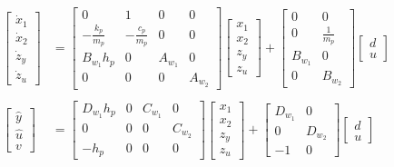 \documentclass{scrreprt}
\begin{document}
\begin{equation}
\begin{aligned}
\begin{bmatrix}
\dot{x}_1 \\
\dot{x}_2 \\
\dot{z}_y \\
\dot{z}_u
\end{bmatrix}
&=
\begin{bmatrix}
0 & 1 & 0 & 0 \\
-\frac{k_p}{m_p} & -\frac{c_p}{m_p} & 0 & 0 \\
B_{w_1}h_p & 0 & A_{w_1} & 0 \\
0 & 0 & 0 & A_{w_2}
\end{bmatrix}
\begin{bmatrix}
x_1 \\
x_2 \\
z_y \\
z_u
\end{bmatrix}
+
\begin{bmatrix}
0 & 0 \\
0 & \frac{1}{m_p} \\
B_{w_1} & 0 \\
0 & B_{w_2}
\end{bmatrix}
\begin{bmatrix}
d \\
u
\end{bmatrix}
\\ \\
\begin{bmatrix}
\hat{y} \\
\hat{u} \\
v
\end{bmatrix}
&=
\begin{bmatrix}
D_{w_1}h_p & 0 & C_{w_1} & 0 \\
0 & 0 & 0 & C_{w_2} \\
-h_p & 0 & 0 & 0
\end{bmatrix}
\begin{bmatrix}
x_1 \\
x_2 \\
z_y \\
z_u
\end{bmatrix}
+
\begin{bmatrix}
D_{w_1} & 0 \\
0 & D_{w_2} \\
-1 & 0
\end{bmatrix}
\begin{bmatrix}
d \\
u
\end{bmatrix}
\end{aligned}
\label{eq:ss_aut}
\end{equation}
\end{document}
